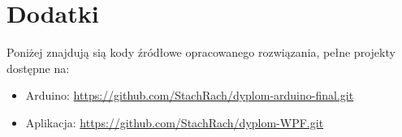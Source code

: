 \documentclass[nostrict]{szablonPG}
\numberwithin{figure}{chapter}
\numberwithin{table}{chapter}
\numberwithin{equation}{chapter}
\begin{document}




%  						




\tableofcontents













\renewcommand{\baselinestretch}{1.0}\normalsize
{}
\listoffigures

\renewcommand{\baselinestretch}{1.0}\normalsize
{}

\listoftables
\renewcommand{\baselinestretch}{1.3}\normalsize

\chapter*{Dodatki}
% 

Poniżej znajdują sią kody źródłowe opracowanego rozwiązania, pełne projekty dostępne na:
\begin{itemize}
    \item Arduino: \url{https://github.com/StachRach/dyplom-arduino-final.git}
    \item Aplikacja: \url{https://github.com/StachRach/dyplom-WPF.git}
\end{itemize}





\end{document}
